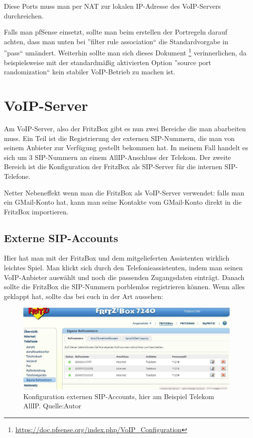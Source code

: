 \documentclass[a4paper,12pt]{scrbook}
\begin{document}
Diese Ports muss man per NAT zur lokalen IP-Adresse des VoIP-Servers durchreichen.

Falls man pfSense einsetzt, sollte man beim erstellen der Portregeln darauf achten, dass man 
unten bei ''filter rule association`` die Standardvorgabe in ''pass`` umändert. Weiterhin sollte man sich
dieses Dokument \footnote{\url{https://doc.pfsense.org/index.php/VoIP_Configuration}} verinnerlichen, da
beispielsweise mit der standardmäßig aktivierten Option ''source port randomization`` kein stabiler VoIP-Betrieb 
zu machen ist.

\section{VoIP-Server}
Am VoIP-Server, also der FritzBox gibt es nun zwei Bereiche die man abarbeiten muss. Ein Teil ist die Registrierung der externen SIP-Nummern,
die man von seinem Anbieter zur Verfügung gestellt bekommen hat. In meinem Fall handelt es sich um 3 SIP-Nummern an einem AllIP-Anschluss der Telekom.
Der zweite Bereich ist die Konfiguration der FritzBox als SIP-Server für die internen SIP-Telefone.


Netter Nebeneffekt wenn man die FritzBox als VoIP-Server verwendet: falls man ein GMail-Konto hat, kann man seine Kontakte vom GMail-Konto direkt in die FritzBox importieren.
\subsection{Externe SIP-Accounts}
Hier hat man mit der FritzBox und dem mitgelieferten Assistenten wirklich leichtes Spiel. Man klickt sich durch den Telefonieassistenten, indem man seinen 
VoIP-Anbieter auswählt und noch die passenden Zugangsdaten einträgt. Danach sollte die FritzBox die SIP-Nummern porblemlos registrieren können. Wenn alles geklappt hat,
sollte das bei euch in der Art aussehen:

\begin{figure}[H]
\begin{center}
\includegraphics[width=1\hsize]{./images/voip-server-fritzbox-extsip.png}
\end{center}
\caption[Konfiguration externen SIP-Accounts, hier am Beispiel Telekom AllIP.]
{\label{voip-server-fritzbox-extsip}Konfiguration externen SIP-Accounts, hier am Beispiel Telekom AllIP. Quelle:Autor}
\end{figure}
\end{document}
